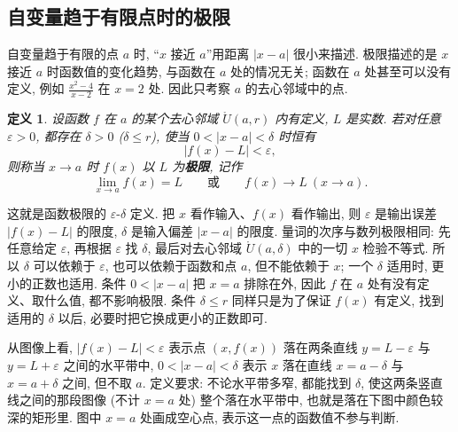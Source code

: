 \documentclass[UTF8,openany]{ctexbook}
\theoremstyle{chinesetextbook}
\newtheorem{definition}{定义}[section]
\begin{document}
\subsection{自变量趋于有限点时的极限}
自变量趋于有限的点 $a$ 时, “$x$ 接近 $a$”用距离 $|x-a|$ 很小来描述. 极限描述的是 $x$ 接近 $a$ 时函数值的变化趋势, 与函数在 $a$ 处的情况无关; 函数在 $a$ 处甚至可以没有定义, 例如 $\displaystyle\frac{x^2-4}{x-2}$ 在 $x=2$ 处. 因此只考察 $a$ 的去心邻域中的点.
\begin{definition}
设函数 $f$ 在 $a$ 的某个去心邻域 $\mathring U(a,r)$ 内有定义, $L$ 是实数. 若对任意 $\varepsilon>0$, 都存在 $\delta>0$ ($\delta\le r$), 使当 $0<|x-a|<\delta$ 时恒有
\[
|f(x)-L|<\varepsilon,
\]
则称当 $x\to a$ 时 $f(x)$ 以 $L$ 为\textbf{极限}, 记作
\[
\lim_{x\to a}f(x)=L\qquad\text{或}\qquad f(x)\to L\ (x\to a).
\]
\end{definition}
这就是函数极限的 $\varepsilon$-$\delta$ 定义. 把 $x$ 看作输入、$f(x)$ 看作输出, 则 $\varepsilon$ 是输出误差 $|f(x)-L|$ 的限度, $\delta$ 是输入偏差 $|x-a|$ 的限度. 量词的次序与数列极限相同: 先任意给定 $\varepsilon$, 再根据 $\varepsilon$ 找 $\delta$, 最后对去心邻域 $\mathring U(a,\delta)$ 中的一切 $x$ 检验不等式. 所以 $\delta$ 可以依赖于 $\varepsilon$, 也可以依赖于函数和点 $a$, 但不能依赖于 $x$; 一个 $\delta$ 适用时, 更小的正数也适用. 条件 $0<|x-a|$ 把 $x=a$ 排除在外, 因此 $f$ 在 $a$ 处有没有定义、取什么值, 都不影响极限. 条件 $\delta\le r$ 同样只是为了保证 $f(x)$ 有定义, 找到适用的 $\delta$ 以后, 必要时把它换成更小的正数即可.

从图像上看, $|f(x)-L|<\varepsilon$ 表示点 $(x,f(x))$ 落在两条直线 $y=L-\varepsilon$ 与 $y=L+\varepsilon$ 之间的水平带中, $0<|x-a|<\delta$ 表示 $x$ 落在直线 $x=a-\delta$ 与 $x=a+\delta$ 之间, 但不取 $a$. 定义要求: 不论水平带多窄, 都能找到 $\delta$, 使这两条竖直线之间的那段图像 (不计 $x=a$ 处) 整个落在水平带中, 也就是落在下图中颜色较深的矩形里. 图中 $x=a$ 处画成空心点, 表示这一点的函数值不参与判断.
\begin{center}
\end{center}
\end{document}
